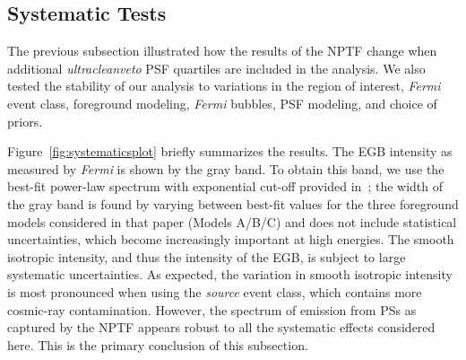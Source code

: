 \subsection{Systematic Tests}
\label{sec:systematictests}

The previous subsection illustrated how the results of the NPTF change when additional {\it ultracleanveto} PSF quartiles are included in the analysis. We also tested the stability of our analysis to variations in the region of interest, \emph{Fermi} event class,  foreground modeling, \emph{Fermi} bubbles, PSF modeling, and choice of priors.  %

Figure~\ref{fig:systematicsplot} briefly summarizes the results.  The EGB intensity as measured by \emph{Fermi} is shown by the gray band.  To obtain this band, we use the best-fit power-law spectrum with exponential cut-off provided in~\cite{Ackermann:2014usa}; the width of the gray band is found by varying between best-fit values for the three foreground models considered in that paper (Models A/B/C) and does not include statistical uncertainties, which become increasingly important at high energies.  The smooth isotropic intensity, and thus the intensity of the EGB, is subject to large systematic uncertainties.   As expected, the variation in smooth isotropic intensity is most pronounced when using the {\it source} event class, which contains more cosmic-ray contamination.    However, the spectrum of emission from PSs as captured by the NPTF appears robust to all the systematic effects considered here.  This is the primary conclusion of this subsection. 


